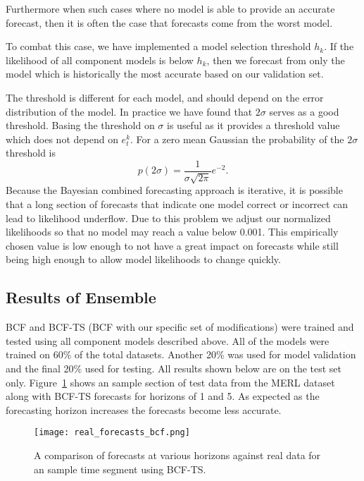Furthermore when such cases where no model is able to provide an accurate forecast, then it is often the case that forecasts come from the worst model.  

To combat this case, we have implemented a model selection threshold $h_{k}$.  If the likelihood of all component models is below $h_{k}$, then we forecast from only the model which is historically the most accurate based on our validation set.  

The threshold is different for each model, and should depend on the error distribution of the model.  In practice we have found that $2\sigma$ serves as a good threshold.  Basing the threshold on $\sigma$ is useful as it provides a threshold value which does not depend on $e^{k}_{t}$.  For a zero mean Gaussian the probability of the $2\sigma$ threshold is
\begin{equation}
p(2\sigma) = \frac{1}{\sigma\sqrt{2\pi}}e^{-2}.
\end{equation}
Because the Bayesian combined forecasting approach is iterative, it is possible that a long section of forecasts that indicate one model correct or incorrect can lead to likelihood underflow.  Due to this problem we adjust our normalized likelihoods so that no model may reach a value below 0.001.  This empirically chosen value is low enough to not have a great impact on forecasts while still being high enough to allow model likelihoods to change quickly.

\subsection{Results of Ensemble}

BCF and BCF-TS (BCF with our specific set of modifications) were trained and tested using all component models described above.  All of the models were trained on 60\% of the total datasets.  Another 20\% was used for model validation and the final 20\% used for testing.  All results shown below are on the test set only.  Figure~\ref{fig:realbcf} shows an sample section of test data from the MERL dataset along with BCF-TS forecasts for horizons of 1 and 5.   As expected as the forecasting horizon increases the forecasts become less accurate.

\begin{figure}[h]
\centering
\texttt{[image: real\_forecasts\_bcf.png]}
\caption{A comparison of forecasts at various horizons against real data for an sample time segment using BCF-TS.}
\label{fig:realbcf}
\end{figure}


